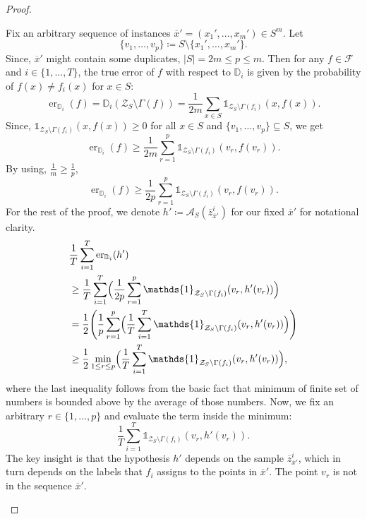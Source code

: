 \begin{proof}
\begin{subproof}
        Fix an arbitrary sequence of instances $\overline{x}'=(x_1',\dots, x_m') \in S^m$. Let
        \[
            \{v_1, \dots, v_p\} \coloneq S \setminus \{x_1', \dots, x_m'\}.
        \]
        Since, $\overline{x}'$ might contain some duplicates, $|S| = 2m \leq p \leq m$. Then for any $f \in \mathcal{F}$ and $i \in \{1, \dots, T\}$, the true error of $f$ with respect to $\mathbb{D}_i$ is given by the probability of $f(x) \neq f_i(x)$ for $x \in S$:
        \[
            \operatorname{er}_{\mathbb{D}_i}(f) = \mathbb{D}_i(\mathcal{Z}_S\setminus\Gamma(f)) = \frac{1}{2m}\sum_{x \in S}\mathds{1}_{\mathcal{Z}_S\setminus\Gamma(f_i)}(x, f(x)).
        \]
        Since, $\mathds{1}_{\mathcal{Z}_S\setminus\Gamma(f_i)}(x, f(x)) \geq 0$ for all $x \in S$ and $\{v_1, \dots, v_p\} \subseteq S$, we get
        \[
            \operatorname{er}_{\mathbb{D}_i}(f) \geq \frac{1}{2m}\sum_{r=1}^p \mathds{1}_{\mathcal{Z}_S\setminus\Gamma(f_i)}(v_r, f(v_r)).
        \]
        By using, $\frac{1}{m} \geq \frac{1}{p}$,
        \[
            \operatorname{er}_{\mathbb{D}_i}(f) \geq \frac{1}{2p}\sum_{r=1}^p \mathds{1}_{\mathcal{Z}_S\setminus\Gamma(f_i)}(v_r, f(v_r)).
        \]
        For the rest of the proof, we denote $h' \coloneq \mathcal{A}_S(\overline{z}_{\overline{x}'}^{i})$ for our fixed $\overline{x}'$ for notational clarity.
        \[
            \begin{aligned}
                &\frac{1}{T}\sum_{i=1}^T\operatorname{er}_{\mathbb{D}_i}(h') \\
                &\geq \frac{1}{T}\sum_{i=1}^T \Bigl(\frac{1}{2p}\sum_{r=1}^p \mathds{1}_{\mathcal{Z}_S\setminus\Gamma(f_i)}(v_r, h'(v_r))\Bigr) \\
                &= \frac{1}{2}\Biggl(\frac{1}{p}\sum_{r=1}^p \Bigl(\frac{1}{T}\sum_{i=1}^T \mathds{1}_{\mathcal{Z}_S\setminus\Gamma(f_i)}(v_r, h'(v_r))\Bigr)\Biggr) \\
                &\geq \frac{1}{2} \min_{1 \leq r \leq p}\Bigl(\frac{1}{T}\sum_{i=1}^T \mathds{1}_{\mathcal{Z}_S\setminus\Gamma(f_i)}(v_r, h'(v_r))\Bigr),
            \end{aligned}
        \]
        where the last inequality follows from the basic fact that minimum of finite set of numbers is bounded above by the average of those numbers.
        Now, we fix an arbitrary $r \in \{1, \dots, p\}$ and evaluate the term inside the minimum:
        \[
            \frac{1}{T}\sum_{i=1}^T \mathds{1}_{\mathcal{Z}_S\setminus\Gamma(f_i)}(v_r, h'(v_r)).
        \]
        The key insight is that the hypothesis $h'$ depends on the sample $\overline{z}_{\overline{x}'}^{i}$, which in turn depends on the labels that $f_i$ assigns to the points in $\overline{x}'$. The point $v_r$ is not in the sequence $\overline{x}'$.


\end{subproof}
\end{proof}
